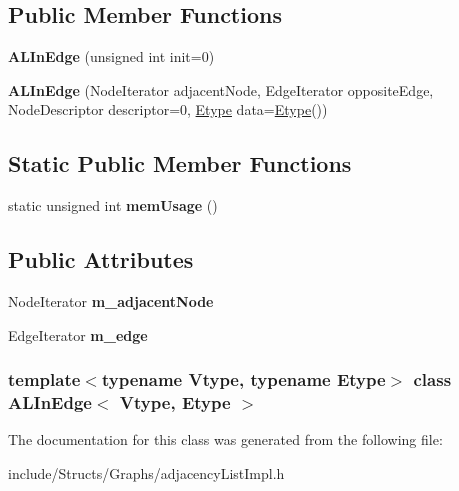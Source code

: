 \subsection*{Public Member Functions}
\begin{DoxyCompactItemize}
\item 
\hypertarget{class_a_l_in_edge_a230912e6ccfddd853d63d1ac28f2695a}{
{\bfseries ALInEdge} (unsigned int init=0)}
\label{class_a_l_in_edge_a230912e6ccfddd853d63d1ac28f2695a}

\item 
\hypertarget{class_a_l_in_edge_a53b5263e977d9ed1a6302c309ebfa63b}{
{\bfseries ALInEdge} (NodeIterator adjacentNode, EdgeIterator oppositeEdge, NodeDescriptor descriptor=0, \hyperlink{class_etype}{Etype} data=\hyperlink{class_etype}{Etype}())}
\label{class_a_l_in_edge_a53b5263e977d9ed1a6302c309ebfa63b}

\end{DoxyCompactItemize}
\subsection*{Static Public Member Functions}
\begin{DoxyCompactItemize}
\item 
\hypertarget{class_a_l_in_edge_ae26d83e52f63ddc544f24fd0cecd0e40}{
static unsigned int {\bfseries memUsage} ()}
\label{class_a_l_in_edge_ae26d83e52f63ddc544f24fd0cecd0e40}

\end{DoxyCompactItemize}
\subsection*{Public Attributes}
\begin{DoxyCompactItemize}
\item 
\hypertarget{class_a_l_in_edge_a98e932fdaea686c82707cde085d2cb72}{
NodeIterator {\bfseries m\_\-adjacentNode}}
\label{class_a_l_in_edge_a98e932fdaea686c82707cde085d2cb72}

\item 
\hypertarget{class_a_l_in_edge_ab1c0ed061f835ab0766568fa3ed05338}{
EdgeIterator {\bfseries m\_\-edge}}
\label{class_a_l_in_edge_ab1c0ed061f835ab0766568fa3ed05338}

\end{DoxyCompactItemize}
\subsubsection*{template$<$typename Vtype, typename Etype$>$ class ALInEdge$<$ Vtype, Etype $>$}



The documentation for this class was generated from the following file:\begin{DoxyCompactItemize}
\item 
include/Structs/Graphs/adjacencyListImpl.h\end{DoxyCompactItemize}
